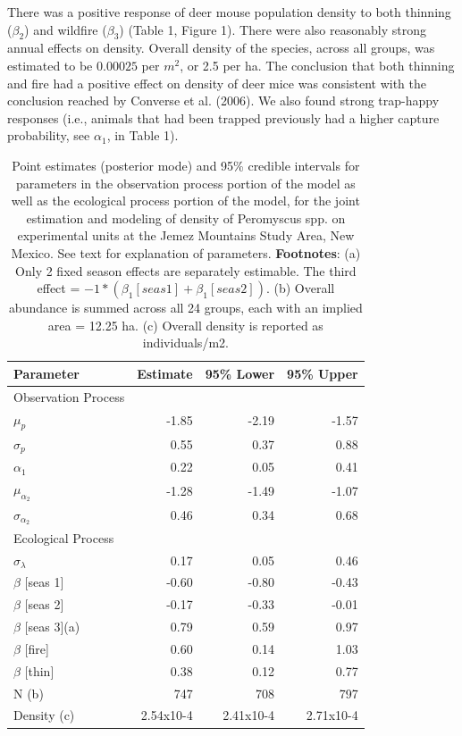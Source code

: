 There was a positive response of deer mouse population density to both
thinning ($\beta_{2}$) and wildfire ($\beta_{3}$) (Table 1, Figure
1). There were also reasonably strong annual effects on
density. Overall density of the species, across all groups, was
estimated to be $0.00025$ per $m^{2}$, or 2.5 per ha. The conclusion
that both thinning and fire had a positive effect on density of
deer mice was consistent with the conclusion reached by Converse et
al. (2006).
We also found strong trap-happy responses (i.e., animals that had been
trapped previously had a higher capture probability, see $\alpha_{1}$,
in Table 1).

\begin{table}
\centering
\caption{
  Point estimates (posterior mode) and 95\% credible intervals
  for parameters in the observation
  process portion of the model as well
  as the ecological process portion of
  the model, for the joint estimation
  and modeling of density of
  Peromyscus spp. on experimental
  units at the Jemez Mountains Study
  Area, New Mexico.  See text for explanation of parameters. 
  {\bf Footnotes}: 
  (a) Only 2 fixed season effects are separately estimable.  The third
  effect =
  $ -1*(\beta_1 [seas 1]+\beta_1 [seas 2])$.
  (b) Overall abundance is summed across all 24 groups, each with an
  implied 
  area = 12.25 ha.  
  (c) Overall density is reported as individuals/m2.  
}
\begin{tabular}{lrrr}
\hline \hline
Parameter &	Estimate &	95\% Lower &	95\% Upper 
\\ \hline
Observation Process & & & \\ \hline
$\mu_{p}$        &-1.85 & -2.19 &	-1.57 \\
$\sigma_{p}$           &0.55  & 0.37  &	0.88 \\
$\alpha_1$        &0.22  & 0.05  &	0.41 \\
$\mu_{\alpha_{2}}$             &-1.28 & -1.49 &	-1.07 \\
$\sigma_{\alpha_{2}}$     &0.46  & 0.34  &		0.68 \\ \hline \hline
Ecological Process & & & \\
\hline
$\sigma_{\lambda}$      & 0.17 & 0.05  &	0.46 \\
$\beta$ [seas 1] &-0.60 & -0.80 &	-0.43 \\
$\beta$ [seas 2] &-0.17 & -0.33 &	-0.01\\
$\beta$ [seas 3](a) &0.79 & 0.59  &	0.97\\
$\beta$ [fire] &	0.60     & 0.14  &	1.03 \\
$\beta$ [thin] &	0.38     & 0.12  &	0.77 \\
N (b)&	747&	708      & 797 \\
Density (c)&2.54x10-4&2.41x10-4&	2.71x10-4 \\ \hline
\end{tabular}
\end{table}





